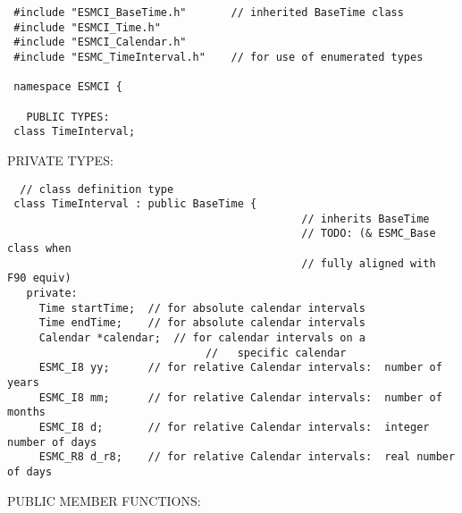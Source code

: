 \begin{verbatim} #include "ESMCI_BaseTime.h"       // inherited BaseTime class
 #include "ESMCI_Time.h"
 #include "ESMCI_Calendar.h"
 #include "ESMC_TimeInterval.h"    // for use of enumerated types
 
 namespace ESMCI {
 
   PUBLIC TYPES:
 class TimeInterval;
 \end{verbatim}{\sf PRIVATE TYPES:}
\begin{verbatim} 
  // class definition type
 class TimeInterval : public BaseTime { 
                                              // inherits BaseTime
                                              // TODO: (& ESMC_Base class when
                                              // fully aligned with F90 equiv)
   private:
     Time startTime;  // for absolute calendar intervals
     Time endTime;    // for absolute calendar intervals
     Calendar *calendar;  // for calendar intervals on a 
                               //   specific calendar
     ESMC_I8 yy;      // for relative Calendar intervals:  number of years
     ESMC_I8 mm;      // for relative Calendar intervals:  number of months
     ESMC_I8 d;       // for relative Calendar intervals:  integer number of days
     ESMC_R8 d_r8;    // for relative Calendar intervals:  real number of days
 \end{verbatim}{\sf PUBLIC MEMBER FUNCTIONS:}
